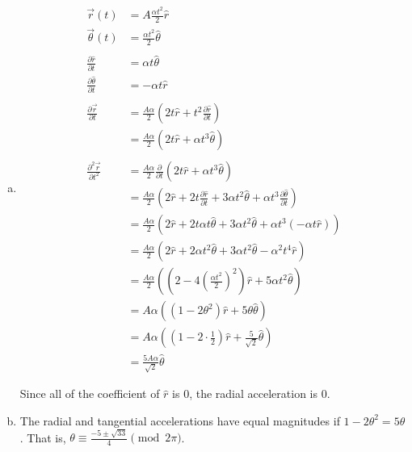 \documentclass{esg8012pset}
\begin{document}
\begin{question}[Problem 2]
\begin{solution}
\begin{enumerate}[a.]
    \item \begin{align*}
            \vec r(t) & = A\frac{\alpha t^2}{2} \hat r \\
            \vec \theta(t) & = \frac{\alpha t^2}{2} \hat\theta \\
            \\
            \frac{\partial \hat r}{\partial t} & = \alpha t \hat \theta \\
            \frac{\partial \hat \theta}{\partial t} & = -\alpha t \hat r \\
            \\
            \frac{\partial \vec r}{\partial t} & = \frac{A\alpha}{2}\left( 2t\hat r + t^2\frac{\partial \hat r}{\partial t}\right) \\
            & = \frac{A\alpha}{2}\left( 2t\hat r + \alpha t^3 \hat \theta\right) \\
            \\
            \frac{\partial^2 \vec r}{\partial t^2} & = \frac{A\alpha}{2}\frac{\partial}{\partial t}\left( 2t\hat r + \alpha t^3 \hat \theta\right) \\
            & = \frac{A\alpha}{2}\left( 2\hat r + 2t\frac{\partial \hat r}{\partial t} + 3\alpha t^2 \hat \theta + \alpha t^3\frac{\partial \hat \theta}{\partial t}\right) \\
            & = \frac{A\alpha}{2}\left( 2\hat r + 2t\alpha t \hat \theta + 3\alpha t^2 \hat \theta + \alpha t^3(-\alpha t \hat r)\right) \\
            & = \frac{A\alpha}{2}\left( 2\hat r + 2\alpha t^2 \hat \theta + 3\alpha t^2 \hat \theta - \alpha^2 t^4\hat r\right) \\
            & = \frac{A\alpha}{2}\left( \left(2- 4\left(\frac{\alpha t^2}{2}\right)^2\right)\hat r + 5\alpha t^2\hat \theta \right) \\
            & = A\alpha\left( \left(1- 2\theta^2\right)\hat r + 5\theta\hat \theta \right) \\
            & = A\alpha\left( \left(1- 2\cdot\frac{1}{2}\right)\hat r + \frac{5}{\sqrt{2}}\hat \theta \right) \\
            & = \frac{5A\alpha}{\sqrt{2}}\hat \theta
          \end{align*} \par
          Since all of the coefficient of $\hat r$ is 0, the radial acceleration is 0.
    \item  The radial and tangential accelerations have equal magnitudes if $1- 2\theta^2 = 5\theta$.  That is, $\theta \equiv \frac{-5\pm\sqrt{33}}{4}\pmod{2\pi}$.
  \end{enumerate}
\end{solution}


\end{question}
\end{document}
